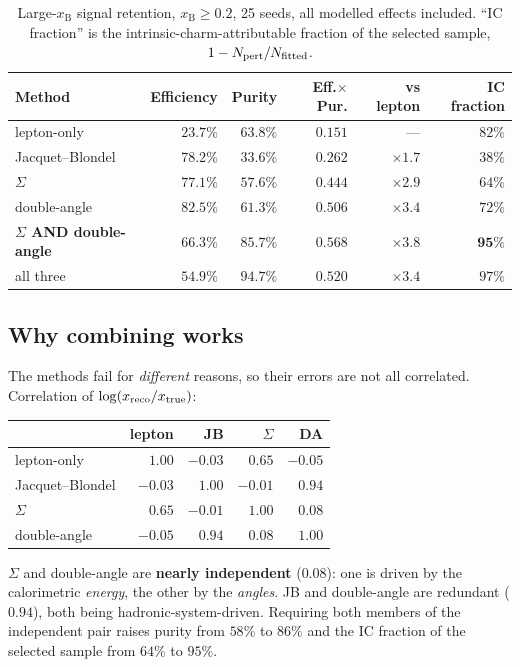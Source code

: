 \documentclass[11pt,a4paper]{article}
\newcommand{\xB}{x_{\mathrm{B}}}
\begin{document}
\begin{table}[htbp]
\centering\small
\begin{tabular}{lrrrrr}
\toprule
Method & Efficiency & Purity & Eff.$\times$Pur. & vs lepton & IC fraction \\
\midrule
lepton-only & $23.7\%$ & $63.8\%$ & $0.151$ & --- & $82\%$ \\
Jacquet--Blondel & $78.2\%$ & $33.6\%$ & $0.262$ & $\times1.7$ & $38\%$ \\
$\Sigma$ & $77.1\%$ & $57.6\%$ & $0.444$ & $\times2.9$ & $64\%$ \\
double-angle & $82.5\%$ & $61.3\%$ & $0.506$ & $\times3.4$ & $72\%$ \\
\midrule
\textbf{$\Sigma$ AND double-angle} & $66.3\%$ & $85.7\%$ & $\mathbf{0.568}$ & $\mathbf{\times3.8}$ & $\mathbf{95\%}$ \\
all three & $54.9\%$ & $94.7\%$ & $0.520$ & $\times3.4$ & $97\%$ \\
\bottomrule
\end{tabular}
\caption{Large-$\xB$ signal retention, $\xB\geq0.2$, 25 seeds, all modelled
effects included. ``IC fraction'' is the intrinsic-charm-attributable fraction
of the selected sample, $1-N_{\rm pert}/N_{\rm fitted}$.}
\label{tab:xreco}
\end{table}

\subsection{Why combining works}
\label{sec:combine}
The methods fail for \emph{different} reasons, so their errors are not all
correlated. Correlation of $\log(x_{\rm reco}/x_{\rm true})$:
\begin{center}\small
\begin{tabular}{lrrrr}
\toprule
 & lepton & JB & $\Sigma$ & DA \\
\midrule
lepton-only & $1.00$ & $-0.03$ & $0.65$ & $-0.05$ \\
Jacquet--Blondel & $-0.03$ & $1.00$ & $-0.01$ & $\mathbf{0.94}$ \\
$\Sigma$ & $0.65$ & $-0.01$ & $1.00$ & $\mathbf{0.08}$ \\
double-angle & $-0.05$ & $0.94$ & $0.08$ & $1.00$ \\
\bottomrule
\end{tabular}
\end{center}
$\Sigma$ and double-angle are \textbf{nearly independent} ($0.08$): one is driven
by the calorimetric \emph{energy}, the other by the \emph{angles}. JB and
double-angle are redundant ($0.94$), both being hadronic-system-driven.
Requiring both members of the independent pair raises purity from $58\%$ to
$86\%$ and the IC fraction of the selected sample from $64\%$ to $95\%$.
\end{document}

